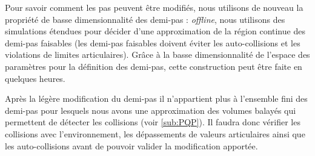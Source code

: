 Pour savoir comment les pas peuvent être modifiés, nous utilisons de nouveau la propriété de basse dimensionnalité des demi-pas : 
\emph{offline}, nous utilisons des simulations étendues pour décider d'une approximation de la région continue des demi-pas faisables (les demi-pas faisables doivent éviter les auto-collisions et les violations de limites articulaires). 
Grâce à la basse dimensionnalité de l'espace des paramètres pour la définition des demi-pas, cette construction peut être faite en quelques heures.

Après la légère modification du demi-pas il n'appartient plus à l'ensemble fini des demi-pas pour lesquels nous avons une approximation des volumes balayés qui permettent de détecter les collisions (voir \ref{sub:PQP}). Il faudra donc vérifier les collisions avec l'environnement, les dépassements de valeurs articulaires ainsi que les auto-collisions avant de pouvoir valider la modification apportée.







